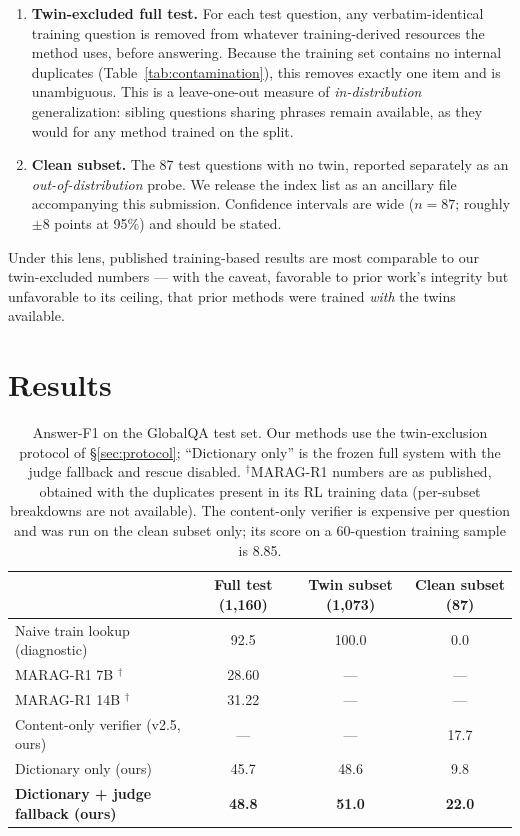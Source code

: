 \documentclass[11pt]{article}
\begin{document}
\begin{enumerate}
\item \textbf{Twin-excluded full test.} For each test question, any verbatim-identical training question is removed from whatever training-derived resources the method uses, before answering. Because the training set contains no internal duplicates (Table~\ref{tab:contamination}), this removes exactly one item and is unambiguous. This is a leave-one-out measure of \emph{in-distribution} generalization: sibling questions sharing phrases remain available, as they would for any method trained on the split.
\item \textbf{Clean subset.} The 87 test questions with no twin, reported separately as an \emph{out-of-distribution} probe. We release the index list as an ancillary file accompanying this submission. Confidence intervals are wide ($n{=}87$; roughly $\pm 8$ points at 95\%) and should be stated.
\end{enumerate}

Under this lens, published training-based results are most comparable to our twin-excluded numbers --- with the caveat, favorable to prior work's integrity but unfavorable to its ceiling, that prior methods were trained \emph{with} the twins available.

\section{Results}
\label{sec:results}

\begin{table}[h]
\centering
\begin{tabular}{lccc}
\toprule
 & Full test (1{,}160) & Twin subset (1{,}073) & Clean subset (87)\\
\midrule
Naive train lookup (diagnostic) & 92.5 & 100.0 & 0.0\\
\midrule
MARAG-R1 7B \cite{marag}$^{\dagger}$ & 28.60 & --- & ---\\
MARAG-R1 14B \cite{marag}$^{\dagger}$ & 31.22 & --- & ---\\
\midrule
Content-only verifier (v2.5, ours) & --- & --- & 17.7\\
Dictionary only (ours) & 45.7 & 48.6 & 9.8\\
\textbf{Dictionary + judge fallback (ours)} & \textbf{48.8} & \textbf{51.0} & \textbf{22.0}\\
\bottomrule
\end{tabular}
\caption{Answer-F1 on the GlobalQA test set. Our methods use the twin-exclusion protocol of \S\ref{sec:protocol}; ``Dictionary only'' is the frozen full system with the judge fallback and rescue disabled. $^{\dagger}$MARAG-R1 numbers are as published, obtained with the duplicates present in its RL training data (per-subset breakdowns are not available). The content-only verifier is expensive per question and was run on the clean subset only; its score on a 60-question training sample is 8.85.}
\label{tab:main}
\end{table}
\end{document}
